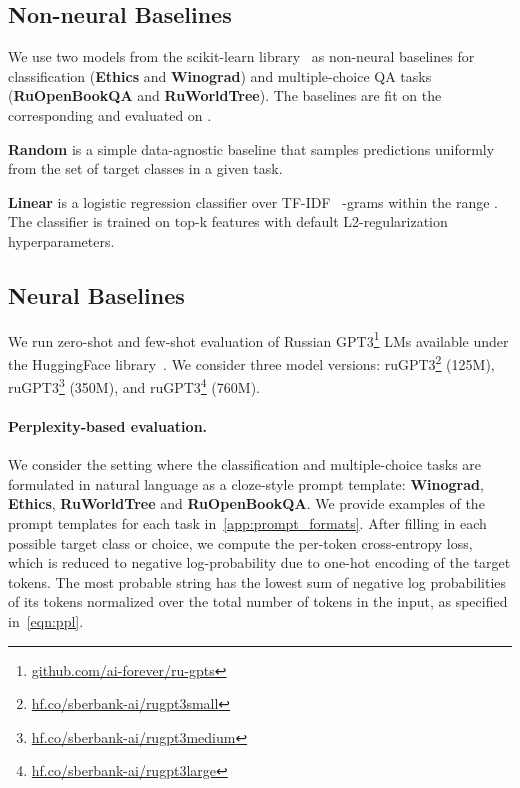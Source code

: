 \documentclass[11pt]{article}
\begin{document}
\subsection{Non-neural Baselines}
We use two models from the scikit-learn library~\cite{pedregosa2011scikit} as non-neural baselines for classification (\textbf{Ethics} and \textbf{Winograd}) and multiple-choice QA tasks (\textbf{RuOpenBookQA} and \textbf{RuWorldTree}). The baselines are fit on the corresponding  and evaluated on .

\vspace{0.5mm}
\noindent \textbf{Random} is a simple data-agnostic baseline that samples predictions uniformly from the set of target classes in a given task.

\noindent \textbf{Linear} is a logistic regression classifier over TF-IDF~\cite{Salton1973OnTS} -grams within the range . The classifier is trained on top-k features with default L2-regularization hyperparameters. 


\subsection{Neural Baselines}
We run zero-shot and few-shot evaluation of Russian GPT3\footnote{\href{https://github.com/ai-forever/ru-gpts}{github.com/ai-forever/ru-gpts}} LMs available under the HuggingFace library~\cite{wolf-etal-2020-transformers}. We consider three model versions: ruGPT3\footnote{\href{https://huggingface.co/sberbank-ai/rugpt3small_based_on_gpt2}{hf.co/sberbank-ai/rugpt3small}} (125M), ruGPT3\footnote{\href{https://huggingface.co/sberbank-ai/rugpt3medium_based_on_gpt2}{hf.co/sberbank-ai/rugpt3medium}} (350M), and ruGPT3\footnote{\href{https://huggingface.co/sberbank-ai/rugpt3large_based_on_gpt2}{hf.co/sberbank-ai/rugpt3large}} (760M).

\paragraph{Perplexity-based evaluation.} We consider the setting where the classification and multiple-choice tasks are formulated in natural language as a cloze-style prompt template: \textbf{Winograd}, \textbf{Ethics}, \textbf{RuWorldTree} and \textbf{RuOpenBookQA}. We provide examples of the prompt templates for each task in~\autoref{app:prompt_formats}. After filling in each possible target class or choice, we compute the per-token cross-entropy loss, which is reduced to negative log-probability due to one-hot encoding of the target tokens. The most probable string has the lowest sum of negative log probabilities of its tokens normalized over the total number of tokens in the input, as specified in~\autoref{eqn:ppl}.
\end{document}
